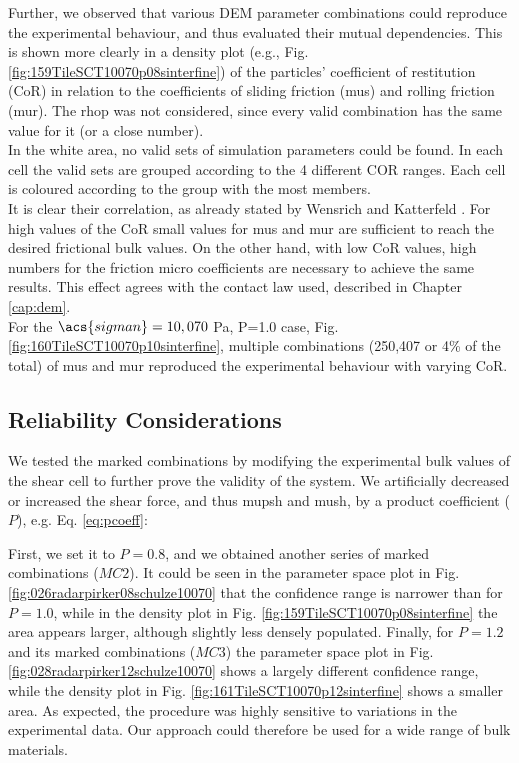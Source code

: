 Further, we observed that various \acs{DEM} parameter
combinations could reproduce the experimental behaviour, and thus evaluated
their mutual dependencies.
This is shown more clearly in a density plot (e.g., Fig. 
\ref{fig:159TileSCT10070p08sinterfine}) 
of the particles' coefficient of restitution (\acs{CoR}) in relation to
the coefficients of sliding friction (\acs{mus}) and rolling friction (\acs{mur}).
The \acs{rhop} was not considered, since every valid combination has the same
value for it (or a close number).\\
In the white area, no valid sets of simulation parameters could be found.
In each cell the valid sets are grouped according to the 4 different COR
ranges.
Each cell is coloured according to the group with the most members.\\
It is clear their correlation, as already stated by Wensrich and 
Katterfeld \cite{RefWorks:87}.
For high values of the \acs{CoR} small values for \acs{mus} and \acs{mur} are
sufficient to reach the desired frictional bulk values.
On the other hand, with low \acs{CoR} values, high numbers for the friction
micro coefficients are necessary to achieve the same results.
This effect agrees with the contact law used, described in Chapter
\ref{cap:dem}.\\
For the $\acs{sigman} = 10,070$ Pa, P=1.0 case, Fig.
\ref{fig:160TileSCT10070p10sinterfine}, multiple
combinations (250,407 or 4\% of the total) of \acs{mus} and \acs{mur} reproduced
the experimental behaviour with varying \acs{CoR}.



\subsection{Reliability Considerations}
\label{subsec:reliabilityconsiderations}

We tested the marked combinations
by modifying the experimental bulk values of the shear cell to further prove
the validity of the system.
We artificially decreased or increased the shear force, and thus \acs{mupsh} and
\acs{mush}, by a product coefficient ($P$), e.g. Eq. \ref{eq:pcoeff}:

First, we set it to $P=0.8$, and we obtained another
series of marked combinations ($MC2$).
It could be seen in the parameter space plot in Fig.
\ref{fig:026radarpirker08schulze10070} that the confidence range is narrower
than for $P=1.0$, while in the density plot in Fig. 
\ref{fig:159TileSCT10070p08sinterfine} the area
appears larger, although slightly less densely populated. Finally, for $P=1.2$
and its marked combinations ($MC3$) the parameter space plot in Fig.
\ref{fig:028radarpirker12schulze10070} shows a largely different confidence
range, while the density plot in Fig. \ref{fig:161TileSCT10070p12sinterfine} 
shows a smaller area. As expected, the procedure was highly sensitive to
variations in the experimental data.
Our approach could therefore be used
for a wide range of bulk materials.\\

